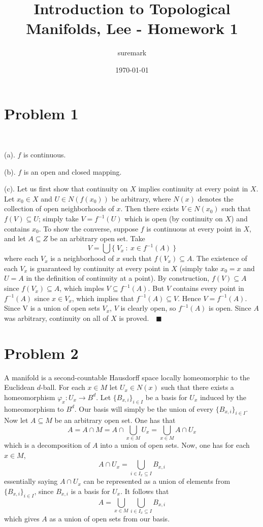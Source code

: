 \documentclass{article}
\title{Introduction to Topological Manifolds, Lee - Homework 1}
\author{suremark}
\date{\today}
\begin{document}
\maketitle
\section{Problem 1}\,

(a). $f$ is continuous.

(b). $f$ is an open and closed mapping.

(c). Let us first show that continuity on $X$ implies continuity at every point in $X$.\newline
Let $x_0\in X$ and $U\in N(f(x_0))$ be arbitrary, where $N(x)$ denotes the collection of open neighborhoods of $x$. Then there exists $V\in N(x_0)$ such that $f(V)\subseteq U$;
simply take $V=f^{-1}(U)$ which is open (by continuity on $X$) and contains $x_0$.\newline
To show the converse, suppose $f$ is continuous at every point in $X$, and let $A\subseteq Z$ be an arbitrary open set. Take
$$V=\bigcup\{\ V_x\ :\ x\in f^{-1}(A)\ \}$$
where each $V_x$ is a neighborhood of $x$ such that $f(V_x)\subseteq A$. The existence of each $V_x$ is guaranteed by continuity at every point in $X$
(simply take $x_0=x$ and $U=A$ in the definition of continuity at a point). By construction, $f(V)\subseteq A$ since $f(V_x)\subseteq A$, which imples $V\subseteq f^{-1}(A)$.
But $V$ contains every point in $f^{-1}(A)$ since $x\in V_x$, which implies that $f^{-1}(A)\subseteq V$. Hence $V=f^{-1}(A)$. Since V is a union of open sets $V_x$,
$V$ is clearly open, so $f^{-1}(A)$ is open.\newline
Since $A$ was arbitrary, continuity on all of $X$ is proved.$\quad\blacksquare$

\section{Problem 2}

A manifold is a second-countable Hausdorff space locally homeomorphic to the Euclidean $d$-ball.
For each $x\in M$ let $U_x\in N(x)$ such that there exists a homeomorphism $\varphi_x: U_x\to B^d$. Let $\{B_{x,i}\}_{i\in I}$ be a basis for $U_x$ induced by the homeomorphism to $B^d$.
Our basis will simply be the union of every $\{B_{x,i}\}_{i\in I}$.\newline
Now let $A\subseteq M$ be an arbitrary open set. One has that
$$A=A\cap M=A\cap\bigcup_{x\in M}U_x=\bigcup_{x\in M}A\cap U_x$$
which is a decomposition of $A$ into a union of open sets. Now, one has for each $x\in M$,
$$A\cap U_x=\bigcup_{i\in I_x\subseteq I} B_{x,i}$$
essentially saying $A\cap U_x$ can be represented as a union of elements from $\{B_{x,i}\}_{i\in I}$, since $B_{x,i}$ is a basis for $U_x$. It follows that
$$A=\bigcup_{x\in M}\bigcup_{i\in I_x\subseteq I} B_{x,i}$$
which gives $A$ as a union of open sets from our basis.
\end{document}
